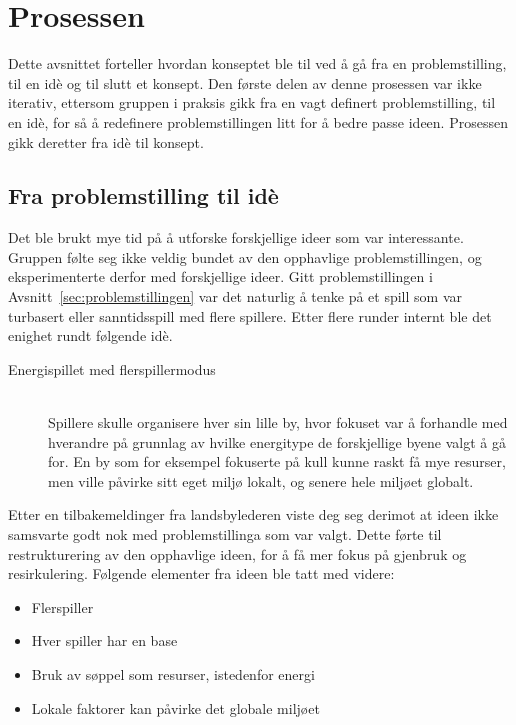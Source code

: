 \section{Prosessen}
Dette avsnittet forteller hvordan konseptet ble til ved å gå fra en
problemstilling, til en idè og til slutt et konsept. Den første delen av
denne prosessen var ikke iterativ, ettersom gruppen i praksis gikk fra en
vagt definert problemstilling, til en idè, for så å redefinere
problemstillingen litt for å bedre passe ideen. Prosessen gikk deretter
fra idè til konsept.
\subsection{Fra problemstilling til idè}
Det ble brukt mye tid på å utforske forskjellige ideer som var
interessante. Gruppen følte seg ikke veldig bundet av den opphavlige
problemstillingen, og eksperimenterte derfor med forskjellige ideer.
Gitt problemstillingen i Avsnitt~\ref{sec:problemstillingen} var det
naturlig å tenke på et spill som var turbasert eller sanntidsspill med
flere spillere. Etter flere runder internt ble det enighet rundt
følgende idè.
\begin{description}
\item[Energispillet med flerspillermodus] \hfill\\
Spillere skulle organisere hver sin lille by, hvor fokuset var å
forhandle med hverandre på grunnlag av hvilke energitype de forskjellige
byene valgt å gå for. En by som for eksempel fokuserte på kull kunne
raskt få mye resurser, men ville påvirke sitt eget miljø lokalt, og
senere hele miljøet globalt.
\end{description}
Etter en tilbakemeldinger fra landsbylederen viste deg seg derimot at
ideen ikke samsvarte godt nok med problemstillinga som var valgt. Dette
førte til restrukturering av den opphavlige ideen, for å få mer fokus på
gjenbruk og resirkulering. Følgende elementer fra ideen ble tatt med
videre:
\begin{itemize}
	\item Flerspiller
	\item Hver spiller har en base
	\item Bruk av søppel som resurser, istedenfor energi
	\item Lokale faktorer kan påvirke det globale miljøet
\end{itemize}


